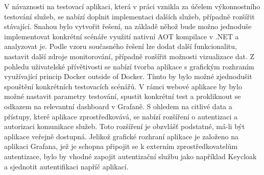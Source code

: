 V návaznosti na testovací aplikaci, která v práci vznikla za účelem výkonnostního testování služeb, se nabízí doplnit implementaci dalších služeb, případně rozšířit stávající. Snahou bylo vytvořit řešení, na základě něhož bude možno jednoduše implementovat konkrétní scénáře využití nativní AOT kompilace v .NET a analyzovat je. Podle vzoru současného řešení lze dodat další funkcionalitu, nastavit další zdroje monitorování, případně rozšířit možnosti vizualizace dat. Z pohledu uživatelské přívětivosti se nabízí tvorba aplikace s grafickým rozhraním využívající princip Docker outside of Docker. Tímto by bylo možné zjednodušit spouštění konkrétních testovacích scénářů. V rámci webové aplikace by bylo možné nastavit parametry testování, spustit konkrétní test a prokliknout se odkazem na relevantní dashboard v Grafaně. S ohledem na citlivé data a přístupy, které aplikace zprostředkovává, se nabízí rozšíření o autentizaci a autorizaci komunikace služeb. Toto rozšíření je obzvlášť podstatné, má-li být aplikace veřejně dostupná. Jelikož grafické rozhraní aplikace je založeno na aplikaci Grafana, jež je schopna připojit se k externím zprostředkovatelům autentizace, bylo by vhodné zapojit autentizační službu jako například Keycloak a sjednotit autentifikaci napříč aplikací.
